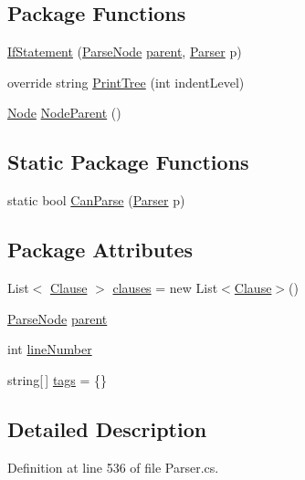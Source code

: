 \subsection*{Package Functions}
\begin{DoxyCompactItemize}
\item 
\hyperlink{a00108_ae534078389e8663edf7660403acf3cbc}{If\-Statement} (\hyperlink{a00138}{Parse\-Node} \hyperlink{a00138_af313a82103fcc2ff5a177dbb06b92f7b}{parent}, \hyperlink{a00139}{Parser} p)
\item 
override string \hyperlink{a00108_a5494c1daef8e0f3ac3ab68f91db4f332}{Print\-Tree} (int indent\-Level)
\item 
\hyperlink{a00128}{Node} \hyperlink{a00138_a580e520a29444fc23ac3660cbe514a09}{Node\-Parent} ()
\end{DoxyCompactItemize}
\subsection*{Static Package Functions}
\begin{DoxyCompactItemize}
\item 
static bool \hyperlink{a00108_afd6b96e1a27872701c4e6832f17fc3ce}{Can\-Parse} (\hyperlink{a00139}{Parser} p)
\end{DoxyCompactItemize}
\subsection*{Package Attributes}
\begin{DoxyCompactItemize}
\item 
List$<$ \hyperlink{a00040}{Clause} $>$ \hyperlink{a00108_a679b1a21582c78ed06df36bccc9c3cbc}{clauses} = new List$<$\hyperlink{a00040}{Clause}$>$()
\item 
\hyperlink{a00138}{Parse\-Node} \hyperlink{a00138_af313a82103fcc2ff5a177dbb06b92f7b}{parent}
\item 
int \hyperlink{a00138_a18b493382de0fde5b4299c1bd2250075}{line\-Number}
\item 
string\mbox{[}$\,$\mbox{]} \hyperlink{a00138_a58b3a15788fd2d4127d73619dc6d04ae}{tags} = \{\}
\end{DoxyCompactItemize}


\subsection{Detailed Description}


Definition at line 536 of file Parser.\-cs.



